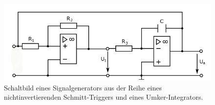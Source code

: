 \begin{figure}
    \centering 
    \includegraphics[width=.9\textwidth]{Bilder/Signal.png}
    \caption{Schaltbild eines Signalgenerators aus der Reihe eines nichtinvertierenden Schmitt-Triggers und eines Umker-Integrators.}
    \label{fig:Signal}
\end{figure}


